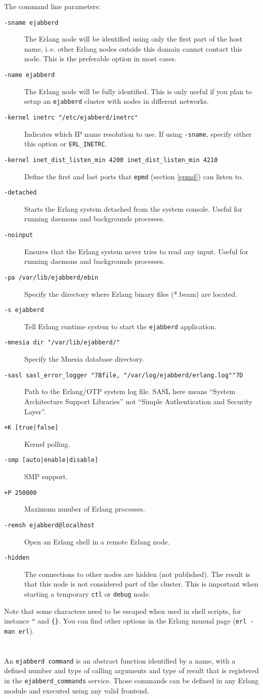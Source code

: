 \documentclass[a4paper,10pt]{book}
\newcommand{\makesection}[2]{ \aname{#1}{} \section{\ahrefloc{#1}{#2}} \label{#1} }
\newcommand{\bracehack}{\def\{{\char"7B}\def\}{\char"7D}}
\newcommand{\titem}[1]{\item[\bracehack\texttt{#1}]}
\newcommand{\term}[1]{\texttt{#1}}
\newcommand{\shell}[1]{\texttt{#1}}
\newcommand{\ejabberd}{\texttt{ejabberd}}
\begin{document}
The command line parameters:
\begin{description}
  \titem{-sname ejabberd}
	The Erlang node will be identified using only the first part
	of the host name, i.\,e. other Erlang nodes outside this domain cannot contact
	this node. This is the preferable option in most cases.
  \titem{-name ejabberd}
	The Erlang node will be fully identified.
    This is only useful if you plan to setup an \ejabberd{} cluster with nodes in different networks.
  \titem{-kernel inetrc "/etc/ejabberd/inetrc"}
	Indicates which IP name resolution to use.
	If using \term{-sname}, specify either this option or \term{ERL\_INETRC}.
  \titem{-kernel inet\_dist\_listen\_min 4200 inet\_dist\_listen\_min 4210}
	Define the first and last ports that \term{epmd} (section \ref{epmd}) can listen to.
  \titem{-detached}
        Starts the Erlang system detached from the system console.
	Useful for running daemons and backgrounds processes.
  \titem{-noinput}
	Ensures that the Erlang system never tries to read any input.
	Useful for running daemons and backgrounds processes.
  \titem{-pa /var/lib/ejabberd/ebin}
	Specify the directory where Erlang binary files (*.beam) are located.
  \titem{-s ejabberd}
	Tell Erlang runtime system to start the \ejabberd{} application.
  \titem{-mnesia dir "/var/lib/ejabberd/"}
	Specify the Mnesia database directory.
  \titem{-sasl sasl\_error\_logger \{file, "/var/log/ejabberd/erlang.log"\}}
	Path to the Erlang/OTP system log file.
        SASL here means ``System Architecture Support Libraries''
        not ``Simple Authentication and Security Layer''.
  \titem{+K [true|false]}
	Kernel polling.
  \titem{-smp [auto|enable|disable]}
	SMP support.
  \titem{+P 250000}
	Maximum number of Erlang processes.
  \titem{-remsh ejabberd@localhost}
	Open an Erlang shell in a remote Erlang node.
  \titem{-hidden}
	The connections to other nodes are hidden (not published).
	The result is that this node is not considered part of the cluster.
	This is important when starting a temporary \term{ctl} or \term{debug} node.
\end{description}
Note that some characters need to be escaped when used in shell scripts, for instance \verb|"| and \verb|{}|.
You can find other options in the Erlang manual page (\shell{erl -man erl}).

\makesection{eja-commands}{\ejabberd{} Commands}

An \term{ejabberd command} is an abstract function identified by a name,
with a defined number and type of calling arguments and type of result
that is registered in the \term{ejabberd\_commands} service.
Those commands can be defined in any Erlang module and executed using any valid frontend.
\end{document}
